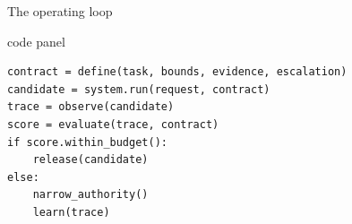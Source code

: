 \documentclass[aspectratio=169,12pt]{beamer}
\begin{document}
\begin{frame}[fragile]{The operating loop}
  \begin{beamercolorbox}[wd=\textwidth,sep=0.18cm,leftskip=0.18cm,rightskip=0.18cm]{code panel}
    \vspace{0.20cm}
    \begin{lstlisting}[style=keynote]
contract = define(task, bounds, evidence, escalation)
candidate = system.run(request, contract)
trace = observe(candidate)
score = evaluate(trace, contract)
if score.within_budget():
    release(candidate)
else:
    narrow_authority()
    learn(trace)
    \end{lstlisting}
  \end{beamercolorbox}
\end{frame}
\end{document}
